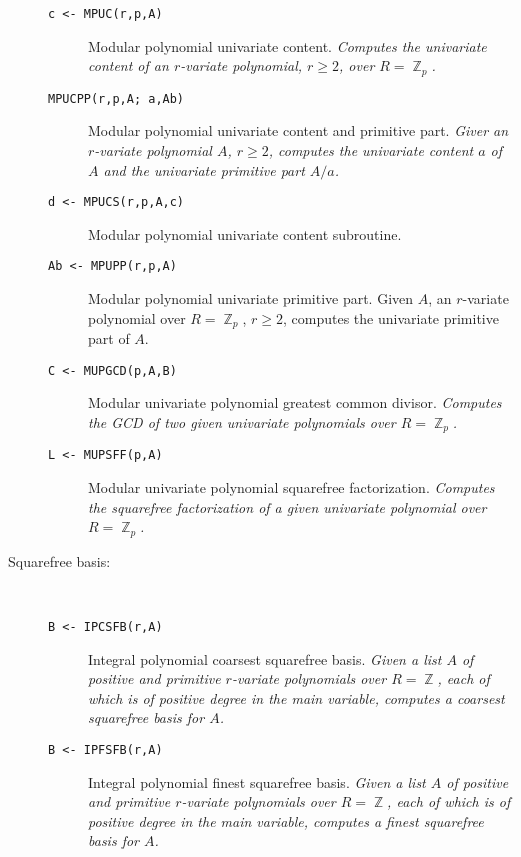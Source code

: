 \begin{description}
\begin{description}
    \item[{\tt c <- MPUC(r,p,A) 
}] Modular polynomial univariate content. {\em Computes
the univariate content of an $r$-variate polynomial, $r \geq 2$, over
$R = \BbbZ_p$.}

    \item[{\tt  MPUCPP(r,p,A; a,Ab) 
}] Modular polynomial univariate content and primitive
part. {\em Giver an $r$-variate polynomial $A$, $r \geq 2$, computes
the univariate content $a$ of $A$ and the univariate primitive part
$A/a$.}

    \item[{\tt d <- MPUCS(r,p,A,c) 
}] Modular polynomial univariate content subroutine.

    \item[{\tt Ab <- MPUPP(r,p,A) 
}] Modular polynomial univariate primitive part. {Given
$A$, an $r$-variate polynomial over $R = \BbbZ_p$, $r \geq 2$,
computes the univariate primitive part of $A$.}

    \item[{\tt C <- MUPGCD(p,A,B) 
}] Modular univariate polynomial greatest common
divisor. {\em Computes the GCD of two given univariate polynomials
over $R =
\BbbZ_p$.} 

    \item[{\tt L <- MUPSFF(p,A) 
}] Modular univariate polynomial squarefree
factorization. {\em Computes the squarefree factorization of a given
univariate polynomial over $R = \BbbZ_p$.}

  \end{description}

\item[Squarefree basis:] \ \
  \begin{description}

    \item[{\tt B <- IPCSFB(r,A) 
}] Integral polynomial coarsest squarefree basis. {\em
Given a list $A$ of positive and primitive $r$-variate polynomials
over $R = \BbbZ$, each of which is of positive degree in the main
variable, computes a coarsest squarefree basis for $A$.}

    \item[{\tt B <- IPFSFB(r,A) 
}] Integral polynomial finest squarefree basis. {\em
Given a list $A$ of positive and primitive $r$-variate polynomials
over $R = \BbbZ$, each of which is of positive degree in the main
variable, computes a finest squarefree basis for $A$.}


\end{description}
\end{description}
